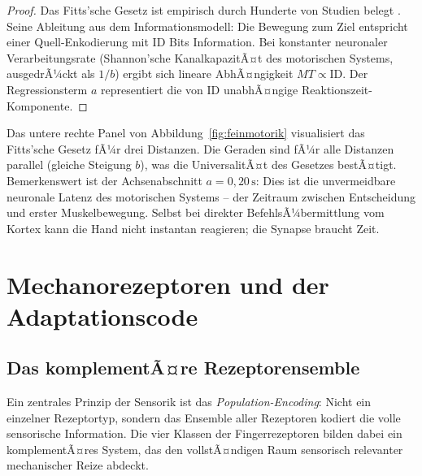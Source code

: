 ﻿\documentclass[12pt,a4paper]{report}
\theoremstyle{plain}
\theoremstyle{definition}
\theoremstyle{remark}
\begin{document}
\begin{proof}
Das Fitts'sche Gesetz ist empirisch durch Hunderte von Studien belegt
\cite{fitts1954, mackenzie1992}. Seine Ableitung aus dem Informationsmodell:
Die Bewegung zum Ziel entspricht einer Quell-Enkodierung mit $\mathrm{ID}$
Bits Information. Bei konstanter neuronaler Verarbeitungsrate
(Shannon'sche KanalkapazitÃ¤t des motorischen Systems, ausgedrÃ¼ckt als $1/b$)
ergibt sich lineare AbhÃ¤ngigkeit $MT \propto \mathrm{ID}$. Der
Regressionsterm $a$ representiert die von $\mathrm{ID}$ unabhÃ¤ngige
Reaktionszeit-Komponente.
\end{proof}

Das untere rechte Panel von Abbildung~\ref{fig:feinmotorik} visualisiert
das Fitts'sche Gesetz fÃ¼r drei Distanzen. Die Geraden sind fÃ¼r alle Distanzen
parallel (gleiche Steigung $b$), was die UniversalitÃ¤t des Gesetzes
bestÃ¤tigt. Bemerkenswert ist der Achsenabschnitt $a = 0{,}20\,\text{s}$:
Dies ist die unvermeidbare neuronale Latenz des motorischen Systems --
der Zeitraum zwischen Entscheidung und erster Muskelbewegung. Selbst
bei direkter BefehlsÃ¼bermittlung vom Kortex kann die Hand nicht instantan
reagieren; die Synapse braucht Zeit.

\chapter{Mechanorezeptoren und der Adaptationscode}
\label{chap:mechanorezeptoren}

\section{Das komplementÃ¤re Rezeptorensemble}

Ein zentrales Prinzip der Sensorik ist das \emph{Population-Encoding}:
Nicht ein einzelner Rezeptortyp, sondern das Ensemble aller Rezeptoren
kodiert die volle sensorische Information. Die vier Klassen der
Fingerrezeptoren bilden dabei ein komplementÃ¤res System, das den
vollstÃ¤ndigen Raum sensorisch relevanter mechanischer Reize abdeckt.
\end{document}
